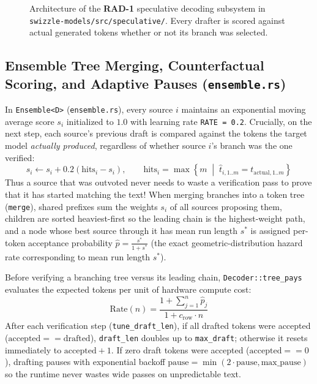 \documentclass[10pt,a4paper]{article}
\theoremstyle{swzstyle}
\newcommand{\code}[1]{\texttt{#1}}
\begin{document}
\begin{figure}[htbp]
  \caption{Architecture of the \textbf{RAD-1} speculative decoding subsystem in \texttt{swizzle-models/src/speculative/}. Every drafter is scored against actual generated tokens whether or not its branch was selected.}
  \label{fig:rad1_architecture}
\end{figure}

\subsection{Ensemble Tree Merging, Counterfactual Scoring, and Adaptive Pauses (\texttt{ensemble.rs})}

In \code{Ensemble<D>} (\code{ensemble.rs}), every source $i$ maintains an exponential moving average score $s_i$ initialized to $1.0$ with learning rate \code{RATE = 0.2}. Crucially, on the next step, each source's previous draft is compared against the tokens the target model \emph{actually produced}, regardless of whether source $i$'s branch was the one verified:
\begin{equation}
  s_i \leftarrow s_i + 0.2 \left(\text{hits}_i - s_i\right), \qquad \text{hits}_i = \max\left\{m \;\middle|\; \hat{t}_{i, 1..m} = t_{\text{actual}, 1..m}\right\}
\end{equation}
Thus a source that was outvoted never needs to waste a verification pass to prove that it has started matching the text! When merging branches into a token tree (\code{merge}), shared prefixes sum the weights $s_i$ of all sources proposing them, children are sorted heaviest-first so the leading chain is the highest-weight path, and a node whose best source through it has mean run length $s^*$ is assigned per-token acceptance probability $\hat{p} = \frac{s^*}{1 + s^*}$ (the exact geometric-distribution hazard rate corresponding to mean run length $s^*$).

Before verifying a branching tree versus its leading chain, \code{Decoder::tree\_pays} evaluates the expected tokens per unit of hardware compute cost:
\begin{equation}
  \text{Rate}(n) = \frac{1 + \sum_{j=1}^{n} \hat{p}_j}{1 + c_{\text{row}} \cdot n}
\end{equation}
After each verification step (\code{tune\_draft\_len}), if all drafted tokens were accepted ($\text{accepted} == \text{drafted}$), \code{draft\_len} doubles up to \code{max\_draft}; otherwise it resets immediately to $\text{accepted} + 1$. If zero draft tokens were accepted ($\text{accepted} == 0$), drafting pauses with exponential backoff $\text{pause} = \min(2 \cdot \text{pause}, \text{max\_pause})$ so the runtime never wastes wide passes on unpredictable text.
\end{document}
